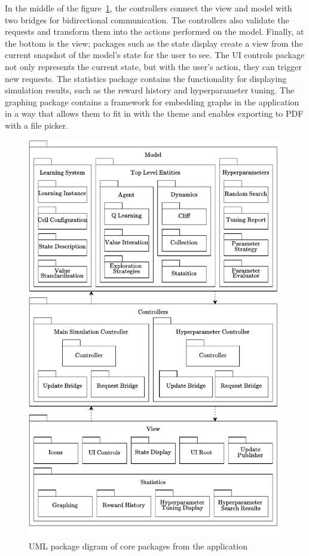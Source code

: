 \documentclass[]{final_report}
\begin{document}
In the middle of the figure~\ref{fig:package-diagram}, the controllers connect the view and model with two bridges for bidirectional communication. The controllers also validate the requests and transform them into the actions performed on the model. Finally, at the bottom is the view; packages such as the state display create a view from the current snapshot of the model's state for the user to see. The UI controls package not only represents the current state, but with the user's action, they can trigger new requests. The statistics package contains the functionality for displaying simulation results, such as the reward history and hyperparameter tuning. The graphing package contains a framework for embedding graphs in the application in a way that allows them to fit in with the theme and enables exporting to PDF with a file picker.

\begin{figure}[H]
  \centering
  
  \includegraphics[width=\textwidth]{package_diagram-2.pdf}
  
  \caption{\label{fig:package-diagram} UML package digram of core packages from the application}
\end{figure}
\end{document}
